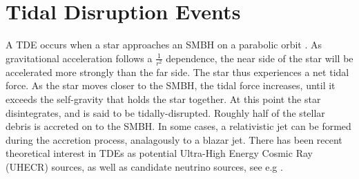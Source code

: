 \documentclass[twocolumn, tighten, linenumbers]{aastex62}
\begin{document}
\section{Tidal Disruption Events}
\label{sec:TDEs}
%
%


A TDE occurs when a star approaches an SMBH on a parabolic orbit \cite{Komossa:2015qya}. As gravitational acceleration follows a $\frac{1}{r^{2}}$ dependence, the near side of the star will be accelerated more strongly than the far side. The star thus experiences a net tidal force. As the star moves closer to the SMBH, the tidal force increases, until it exceeds the self-gravity that holds the star together. At this point the star disintegrates, and is said to be tidally-disrupted. Roughly half of the stellar debris is accreted on to the SMBH. In some cases, a relativistic jet can be formed during the accretion process, analagously to a blazar jet. There has been recent theoretical interest in TDEs as potential Ultra-High Energy Cosmic Ray (UHECR) sources, as well as candidate neutrino sources, see e.g \cite{Biehl:2017hnb}.
\end{document}
